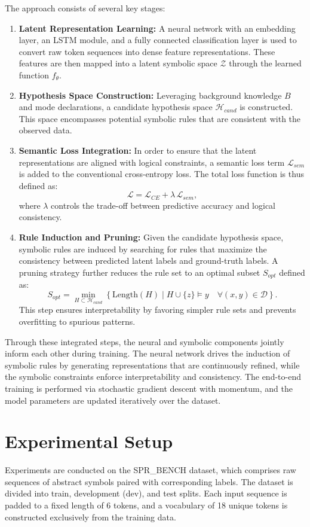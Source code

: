 \documentclass{article}
\begin{document}
The approach consists of several key stages:
\begin{enumerate}
    \item \textbf{Latent Representation Learning:} A neural network with an embedding layer, an LSTM module, and a fully connected classification layer is used to convert raw token sequences into dense feature representations. These features are then mapped into a latent symbolic space \(\mathcal{Z}\) through the learned function \(f_\theta\).
    \item \textbf{Hypothesis Space Construction:} Leveraging background knowledge \(B\) and mode declarations, a candidate hypothesis space \(\mathcal{H}_{cand}\) is constructed. This space encompasses potential symbolic rules that are consistent with the observed data.
    \item \textbf{Semantic Loss Integration:} In order to ensure that the latent representations are aligned with logical constraints, a semantic loss term \(\mathcal{L}_{sem}\) is added to the conventional cross-entropy loss. The total loss function is thus defined as:
    \[
    \mathcal{L} = \mathcal{L}_{CE} + \lambda\, \mathcal{L}_{sem},
    \]
    where \(\lambda\) controls the trade-off between predictive accuracy and logical consistency.
    \item \textbf{Rule Induction and Pruning:} Given the candidate hypothesis space, symbolic rules are induced by searching for rules that maximize the consistency between predicted latent labels and ground-truth labels. A pruning strategy further reduces the rule set to an optimal subset \(S_{opt}\) defined as:
    \[
    S_{opt} = \min_{H \subset \mathcal{H}_{cand}} \left\{ \text{Length}(H) \mid H \cup \{z\} \models y \quad \forall (x,y) \in \mathcal{D} \right\}.
    \]
    This step ensures interpretability by favoring simpler rule sets and prevents overfitting to spurious patterns.
\end{enumerate}

Through these integrated steps, the neural and symbolic components jointly inform each other during training. The neural network drives the induction of symbolic rules by generating representations that are continuously refined, while the symbolic constraints enforce interpretability and consistency. The end-to-end training is performed via stochastic gradient descent with momentum, and the model parameters are updated iteratively over the dataset.

\section{Experimental Setup}
Experiments are conducted on the SPR\_BENCH dataset, which comprises raw sequences of abstract symbols paired with corresponding labels. The dataset is divided into train, development (dev), and test splits. Each input sequence is padded to a fixed length of 6 tokens, and a vocabulary of 18 unique tokens is constructed exclusively from the training data.
\end{document}
